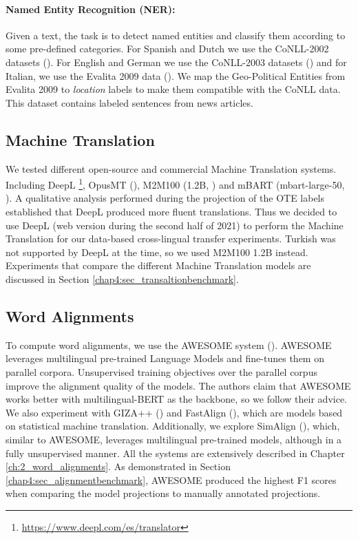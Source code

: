 \paragraph{Named Entity Recognition (NER):} Given a text, the task is to detect named entities and classify them according to some pre-defined categories. For Spanish and Dutch we use the CoNLL-2002 datasets (\cite{DBLP:conf/conll/Sang02}). For English and German we use the CoNLL-2003 datasets (\cite{DBLP:conf/conll/SangM03}) and for Italian, we use the Evalita 2009 data (\cite{speranza2009named}). We map the Geo-Political Entities from Evalita 2009 to {\it location} labels to make them compatible with the CoNLL data. This dataset contains labeled sentences from news articles.



\subsection{Machine Translation}

We tested different open-source and commercial Machine Translation systems. Including DeepL \footnote{\url{https://www.deepl.com/es/translator}}, OpusMT (\cite{tiedemann-thottingal-2020-opus}), M2M100 (1.2B, \cite{JMLR:v22:20-1307}) and mBART (mbart-large-50, \cite{liu-etal-2020-multilingual-denoising,DBLP:journals/corr/abs-2008-00401}). A qualitative analysis performed during the projection of the OTE labels established that DeepL produced more fluent translations. Thus we decided to use DeepL (web version during the second half of 2021) to perform the Machine Translation for our data-based cross-lingual transfer experiments. Turkish was not supported by DeepL at the time, so we used M2M100 1.2B instead. Experiments that compare the different Machine Translation models are discussed in Section \ref{chap4:sec_transaltionbenchmark}.


\subsection{Word Alignments}

To compute word alignments, we use the AWESOME system (\cite{dou-neubig-2021-word}). AWESOME leverages multilingual pre-trained Language Models and fine-tunes them on parallel corpora. Unsupervised training objectives over the parallel corpus improve the alignment quality of the models. The authors claim that AWESOME works better with multilingual-BERT \cite{devlin-etal-2019-bert} as the backbone, so we follow their advice. We also experiment with GIZA++ (\cite{och-ney-2003-systematic-giza}) and FastAlign (\cite{dyer-etal-2013-simple-fastalign}), which are models based on statistical machine translation. Additionally, we explore SimAlign (\cite{jalili-sabet-etal-2020-simalign}), which, similar to AWESOME, leverages multilingual pre-trained models, although in a fully unsupervised manner. All the systems are extensively described in Chapter \ref{ch:2_word_alignments}. As demonstrated in Section \ref{chap4:sec_alignmentbenchmark}, AWESOME produced the highest F1 scores when comparing the model projections to manually annotated projections.

